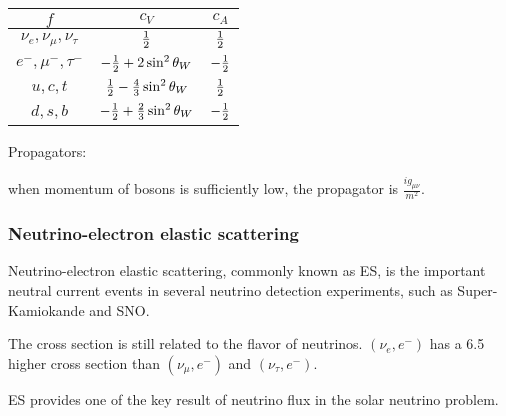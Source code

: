 \begin{table}[htbp]
    \centering
    \begin{tabular}{|c c c|}
        \hline
        $f$ & $c_V$ & $c_A$ \\
        \hline
        $\nu_e,\nu_\mu,\nu_\tau$ & $\frac{1}{2}$ & $\frac{1}{2}$ \\
        \hline
        $e^-,\mu^-,\tau^-$ & $-\frac{1}{2}+2\sin^2{\theta_W}$ & $-\frac{1}{2}$ \\
        \hline
        $u,c,t$ & $\frac{1}{2}-\frac{4}{3}\sin^2{\theta_W}$ & $\frac{1}{2}$ \\
        \hline
        $d,s,b$ & $-\frac{1}{2}+\frac{2}{3}\sin^2{\theta_W}$ & $-\frac{1}{2}$ \\
        \hline
    \end{tabular}
\end{table}

Propagators:


when momentum of bosons is sufficiently low, the propagator is $\frac{ig_{\mu\nu}}{m^2}$.

\subsubsection{Neutrino-electron elastic scattering}

Neutrino-electron elastic scattering, commonly known as ES,
is the important neutral current events in several neutrino detection experiments,
such as Super-Kamiokande\cite{collaboration_solar_2001} and SNO\cite{sno_collaboration_direct_2002}.

The cross section is still related to the flavor of neutrinos.
$(\nu_e,e^-)$ has a 6.5 higher cross section than $(\nu_\mu,e^-)$ and $(\nu_\tau,e^-)$.

ES provides one of the key result of neutrino flux in the solar neutrino problem.


